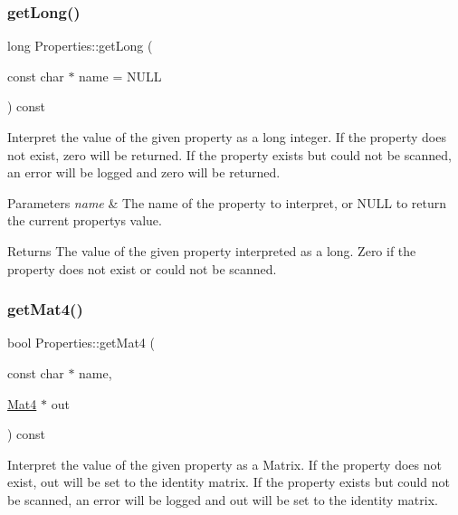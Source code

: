 \subsubsection{\texorpdfstring{get\+Long()}{getLong()}\hspace{0.1cm}{\footnotesize\ttfamily [2/2]}}
{\footnotesize\ttfamily long Properties\+::get\+Long (\begin{DoxyParamCaption}\item[{const char $\ast$}]{name = {\ttfamily NULL} }\end{DoxyParamCaption}) const}

Interpret the value of the given property as a long integer. If the property does not exist, zero will be returned. If the property exists but could not be scanned, an error will be logged and zero will be returned.


\begin{DoxyParams}{Parameters}
{\em name} & The name of the property to interpret, or N\+U\+LL to return the current property\textquotesingle{}s value.\\
\hline
\end{DoxyParams}
\begin{DoxyReturn}{Returns}
The value of the given property interpreted as a long. Zero if the property does not exist or could not be scanned. 
\end{DoxyReturn}
\mbox{\label{classProperties_adf89d5ec337d5cd247b79b6083c820d8}} 
\subsubsection{\texorpdfstring{get\+Mat4()}{getMat4()}\hspace{0.1cm}{\footnotesize\ttfamily [1/2]}}
{\footnotesize\ttfamily bool Properties\+::get\+Mat4 (\begin{DoxyParamCaption}\item[{const char $\ast$}]{name,  }\item[{\hyperlink{classMat4}{Mat4} $\ast$}]{out }\end{DoxyParamCaption}) const}

Interpret the value of the given property as a Matrix. If the property does not exist, out will be set to the identity matrix. If the property exists but could not be scanned, an error will be logged and out will be set to the identity matrix.


